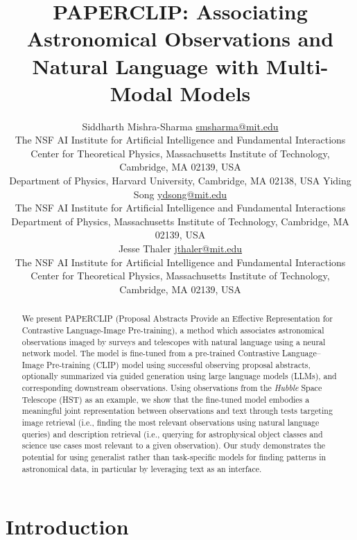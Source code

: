 \documentclass[10pt]{article} %
\title{\textsc{PAPERCLIP}: Associating Astronomical Observations and Natural Language with Multi-Modal Models}
\author{\name Siddharth Mishra-Sharma \email \href{mailto:smsharma@mit.edu}{smsharma@mit.edu} \\
      \addr The NSF AI Institute for Artificial Intelligence and Fundamental Interactions\\
      Center for Theoretical Physics, Massachusetts Institute of Technology, Cambridge, MA 02139, USA \\
      Department of Physics, Harvard University, Cambridge, MA 02138, USA
      \AND
      \name Yiding Song \email \href{mailto:ydsong@mit.edu}{ydsong@mit.edu} \\
      \addr The NSF AI Institute for Artificial Intelligence and Fundamental Interactions\\
      Department of Physics, Massachusetts Institute of Technology, Cambridge, MA 02139, USA \\
      \AND
      \name Jesse Thaler \email \href{mailto:jthaler@mit.edu}{jthaler@mit.edu} \\
      \addr The NSF AI Institute for Artificial Intelligence and Fundamental Interactions\\
      Center for Theoretical Physics, Massachusetts Institute of Technology, Cambridge, MA 02139, USA \\
}
\newcommand{\githubmaster}{\href{https://github.com/smsharma/HubbleCLIP}{\faGithub}\xspace}
\newcommand{\SM}[1]{\textcolor{blue}{[SM: #1]}}
\newcommand{\hubble}{\emph{Hubble}\xspace}
\begin{document}
\maketitle

\thispagestyle{firstpage}

\begin{abstract}
We present PAPERCLIP (Proposal Abstracts Provide an Effective Representation for Contrastive Language-Image Pre-training), a method which associates astronomical observations imaged by surveys and telescopes with natural language  using a neural network model. The model is fine-tuned from a pre-trained Contrastive Language–Image Pre-training (CLIP) model using successful observing proposal abstracts, optionally summarized via guided generation using large language models (LLMs), and corresponding downstream observations. Using observations from the \hubble Space Telescope (HST) as an example, we show that the fine-tuned model embodies a meaningful joint representation between observations and text through tests targeting image retrieval (i.e., finding the most relevant observations using natural language queries) and description retrieval (i.e., querying for astrophysical object classes and science use cases most relevant to a given observation). Our study demonstrates the potential for using generalist rather than task-specific models for finding patterns in astronomical data, in particular by leveraging text as an interface. \githubmaster
\end{abstract}

\tableofcontents

\section{Introduction}
\label{sec:intro}

\end{document}
